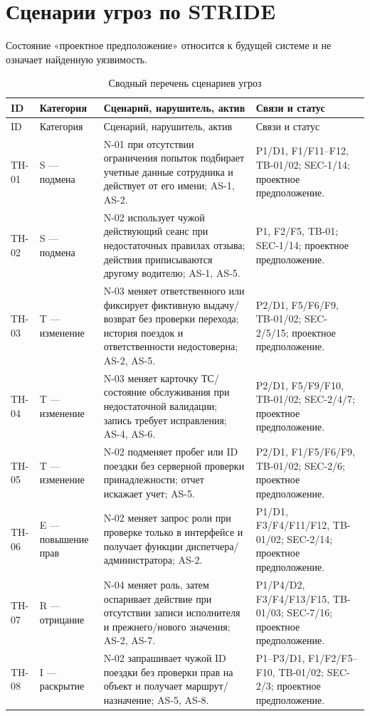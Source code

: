 \documentclass[12pt,a4paper]{article}
\begin{document}
\section{Сценарии угроз по STRIDE}
Состояние «проектное предположение» относится к будущей системе и не означает найденную уязвимость.
\begin{longtable}{p{1.4cm}p{2.3cm}p{7.8cm}p{3.3cm}}
\caption{Сводный перечень сценариев угроз}\\
\toprule ID & Категория & Сценарий, нарушитель, актив & Связи и статус\\\midrule\endfirsthead
\toprule ID & Категория & Сценарий, нарушитель, актив & Связи и статус\\\midrule\endhead
TH-01 & S — подмена & N-01 при отсутствии ограничения попыток подбирает учетные данные сотрудника и действует от его имени; AS-1, AS-2. & P1/D1, F1/F11–F12, TB-01/02; SEC-1/14; проектное предположение.\\
TH-02 & S — подмена & N-02 использует чужой действующий сеанс при недостаточных правилах отзыва; действия приписываются другому водителю; AS-1, AS-5. & P1, F2/F5, TB-01; SEC-1/14; проектное предположение.\\
TH-03 & T — изменение & N-03 меняет ответственного или фиксирует фиктивную выдачу/возврат без проверки перехода; история поездок и ответственности недостоверна; AS-2, AS-5. & P2/D1, F5/F6/F9, TB-01/02; SEC-2/5/15; проектное предположение.\\
TH-04 & T — изменение & N-03 меняет карточку ТС/состояние обслуживания при недостаточной валидации; запись требует исправления; AS-4, AS-6. & P2/D1, F5/F9/F10, TB-01/02; SEC-2/4/7; проектное предположение.\\
TH-05 & T — изменение & N-02 подменяет пробег или ID поездки без серверной проверки принадлежности; отчет искажает учет; AS-5. & P2/D1, F1/F5/F6/F9, TB-01/02; SEC-2/6; проектное предположение.\\
TH-06 & E — повышение прав & N-02 меняет запрос роли при проверке только в интерфейсе и получает функции диспетчера/администратора; AS-2. & P1/D1, F3/F4/F11/F12, TB-01/02; SEC-2/14; проектное предположение.\\
TH-07 & R — отрицание & N-04 меняет роль, затем оспаривает действие при отсутствии записи исполнителя и прежнего/нового значения; AS-2, AS-7. & P1/P4/D2, F3/F4/F13/F15, TB-01/03; SEC-7/16; проектное предположение.\\
TH-08 & I — раскрытие & N-02 запрашивает чужой ID поездки без проверки прав на объект и получает маршрут/назначение; AS-5, AS-8. & P1–P3/D1, F1/F2/F5–F10, TB-01/02; SEC-2/3; проектное предположение.\\

\end{longtable}
\end{document}
